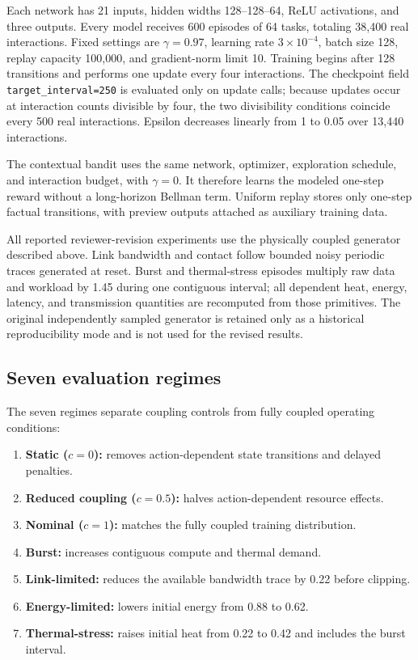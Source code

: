 \documentclass[11pt]{article}
\begin{document}
Each network has 21 inputs, hidden widths 128--128--64, ReLU activations, and three outputs. Every model receives 600 episodes of 64 tasks, totaling 38,400 real interactions. Fixed settings are $\gamma=0.97$, learning rate $3\times10^{-4}$, batch size 128, replay capacity 100,000, and gradient-norm limit 10. Training begins after 128 transitions and performs one update every four interactions. The checkpoint field \texttt{target\_interval=250} is evaluated only on update calls; because updates occur at interaction counts divisible by four, the two divisibility conditions coincide every 500 real interactions. Epsilon decreases linearly from 1 to 0.05 over 13,440 interactions.

The contextual bandit uses the same network, optimizer, exploration schedule, and interaction budget, with $\gamma=0$. It therefore learns the modeled one-step reward without a long-horizon Bellman term. Uniform replay stores only one-step factual transitions, with preview outputs attached as auxiliary training data.

All reported reviewer-revision experiments use the physically coupled generator described above. Link bandwidth and contact follow bounded noisy periodic traces generated at reset. Burst and thermal-stress episodes multiply raw data and workload by 1.45 during one contiguous interval; all dependent heat, energy, latency, and transmission quantities are recomputed from those primitives. The original independently sampled generator is retained only as a historical reproducibility mode and is not used for the revised results.

\subsection{Seven evaluation regimes}

The seven regimes separate coupling controls from fully coupled operating conditions:

\begin{enumerate}[leftmargin=1.6em]
    \item \textbf{Static ($c=0$):} removes action-dependent state transitions and delayed penalties.
    \item \textbf{Reduced coupling ($c=0.5$):} halves action-dependent resource effects.
    \item \textbf{Nominal ($c=1$):} matches the fully coupled training distribution.
    \item \textbf{Burst:} increases contiguous compute and thermal demand.
    \item \textbf{Link-limited:} reduces the available bandwidth trace by 0.22 before clipping.
    \item \textbf{Energy-limited:} lowers initial energy from 0.88 to 0.62.
    \item \textbf{Thermal-stress:} raises initial heat from 0.22 to 0.42 and includes the burst interval.
\end{enumerate}
\end{document}
